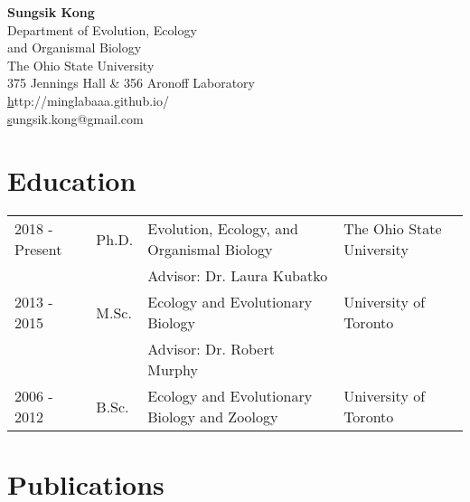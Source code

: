 \documentclass[11pt]{article}
\begin{document}
\pagestyle{plain}

\begin{center}
\huge \textbf{Sungsik Kong}\\
\large Department of Evolution, Ecology \\
and Organismal Biology\\
\large The Ohio State University\\
\large 375 Jennings Hall \& 356 Aronoff Laboratory\\
\small \href{http://minglabaaa.github.io}http://minglabaaa.github.io/\\
\small \href{mailto:sungsik.kong@gmail.com}sungsik.kong@gmail.com
\end{center}

\section*{Education}

\begin{longtable}{p{}  p{} p{} p{}}
2018 - Present & Ph.D. & Evolution, Ecology, and Organismal Biology & The Ohio State University\\
 & & Advisor: Dr. Laura Kubatko\\
2013 - 2015 & {M.Sc.} & Ecology and Evolutionary Biology & University of Toronto\\
 & & Advisor: Dr. Robert Murphy\\
2006 - 2012 & {B.Sc.} & Ecology and Evolutionary Biology and Zoology & University of Toronto\\
\end{longtable}

\hspace{0pt}

\section*{Publications}
\end{document}
